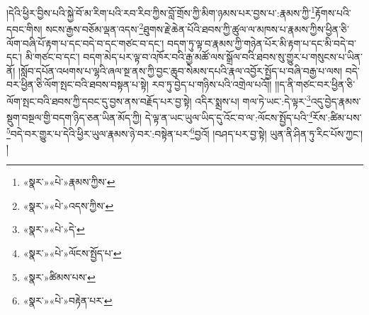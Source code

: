 །དེའི་ཕྱིར་བྱིས་པའི་སྐྱེ་བོ་མ་རིག་པའི་རབ་རིབ་ཀྱིས་བློ་གྲོས་ཀྱི་མིག་ཉམས་པར་བྱས་པ་:རྣམས་ཀྱི་\footnote{«སྣར་»«པེ་»རྣམས་ཀྱིས་}རྟོགས་པའི་དབང་གིས། སངས་རྒྱས་བཅོམ་ལྡན་འདས་\footnote{«སྣར་»«པེ་»འདས་ཀྱིས་}ཐུགས་རྗེ་ཆེན་པོའི་ཐབས་ཀྱི་ཚུལ་ལ་མཁས་པ་རྣམས་ཀྱིས་ཕྱིན་ཅི་ལོག་བཞི་པོ་རྟག་པ་དང་བདེ་བ་དང་གཙང་བ་དང་། བདག་ཏུ་ལྟ་བ་རྣམས་ཀྱི་གཉེན་པོར་མི་རྟག་པ་དང་མི་བདེ་བ་དང་། མི་གཙང་བ་དང་། བདག་མེད་པར་ལྟ་བ་འཁོར་བའི་རྒྱ་མཚོ་ལས་སྒྲོལ་བའི་ཐབས་སུ་གྱུར་པ་གསུངས་པ་ཡིན་ནོ། །སློབ་དཔོན་འཕགས་པ་ལྷའི་ཞལ་སྔ་ནས་ཀྱི་བྱང་ཆུབ་སེམས་དཔའི་རྣལ་འབྱོར་སྤྱོད་པ་བཞི་བརྒྱ་པ་ལས། བདེ་བར་ཕྱིན་ཅི་ལོག་སྤང་བའི་ཐབས་བསྟན་པ་སྟེ། རབ་ཏུ་བྱེད་པ་གཉིས་པའི་འགྲེལ་པའོ།། །།ད་ནི་གཙང་བར་ཕྱིན་ཅི་ལོག་སྤང་བའི་ཐབས་ཀྱི་དབང་དུ་བྱས་ནས་བརྗོད་པར་བྱ་སྟེ། འདིར་སྨྲས་པ། གལ་ཏེ་ཡང་:དེ་ལྟར་\footnote{«སྣར་»«པེ་»དེ་}འདུ་བྱེད་རྣམས་སྡུག་བསྔལ་གྱི་བདག་ཉིད་ཅན་ཡིན་མོད་ཀྱི། དེ་ལྟ་ན་ཡང་ཡུལ་ཡིད་དུ་འོང་བ་ལ་:ལོངས་སྤྱོད་པའི་\footnote{«སྣར་»«པེ་»ལོངས་སྤྱོད་པ་}རོས་:ཚིམ་པས་\footnote{«སྣར་»ཚིམས་པས་}བདེ་བར་གྱུར་པ་དེའི་ཕྱིར་ཡུལ་རྣམས་ཉེ་བར་:བསྟེན་པར་\footnote{«སྣར་»«པེ་»བརྟེན་པར་}བྱའོ། །བཤད་པར་བྱ་སྟེ། ཡུན་ནི་ཤིན་ཏུ་རིང་པོས་ཀྱང་། །
